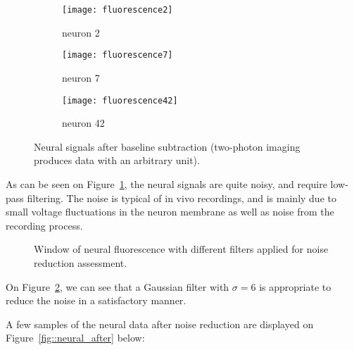 \begin{figure}[H]
	\begin{subfigure}[h]{0.6\textwidth}
		\begin{center}
			\texttt{[image: fluorescence2]}
			\caption{neuron 2}
		\end{center}
	\end{subfigure}
	
	\begin{subfigure}[h]{0.6\textwidth}
		\begin{center}
			\texttt{[image: fluorescence7]}
			\caption{neuron 7}
		\end{center}
	\end{subfigure}
	
	\begin{subfigure}[h]{0.6\textwidth}
		\begin{center}
			\texttt{[image: fluorescence42]}
			\caption{neuron 42}
		\end{center}
	\end{subfigure}
	\caption{Neural signals after baseline subtraction (two-photon imaging produces data with an arbitrary unit).}
	\label{fig::neural_before}
\end{figure}

As can be seen on Figure~\ref{fig::neural_before}, the neural signals are quite noisy, and require low-pass filtering.
The noise is typical of in vivo recordings, and is mainly due to small voltage fluctuations in the neuron membrane as well as noise from the recording process. 

\begin{figure}[H]
	\begin{center}
		
	\end{center}
	\caption{Window of neural fluorescence with different filters applied for noise reduction assessment.}
	\label{fig::neural_denoizing}
\end{figure}

On Figure~\ref{fig::neural_denoizing}, we can see that a Gaussian filter with $\sigma=6$ is appropriate to reduce the noise in a satisfactory manner.

\vspace{\baselineskip}

A few samples of the neural data after noise reduction are displayed on Figure~\ref{fig::neural_after} below:

